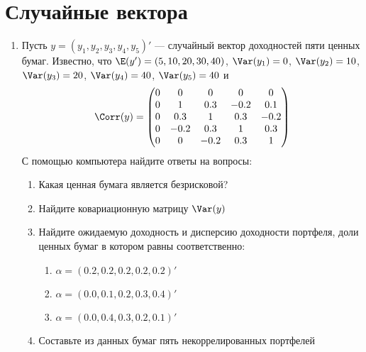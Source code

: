 \section{Случайные вектора}

\begin{enumerate}
\item Пусть $y=(y_1, y_2, y_3, y_4, y_5)'$ --- случайный вектор доходностей пяти ценных бумаг. Известно, что $\E(y')=(5, 10, 20, 30, 40)$, $\Var(y_1)=0$, $\Var(y_2)=10$, $\Var(y_3)=20$, $\Var(y_4)=40$, $\Var(y_5)=40$ и
\[
\Corr(y)=\begin{pmatrix}
0 & 0 & 0 & 0 & 0 \\
0 & 1 & 0.3 & -0.2 & 0.1 \\
0 & 0.3 & 1 & 0.3 & -0.2 \\
0 & -0.2 & 0.3& 1 & 0.3 \\
0 & 0 & -0.2 & 0.3 & 1 
\end{pmatrix}
\]
С помощью компьютера найдите ответы на вопросы:
\begin{enumerate}
\item Какая ценная бумага является безрисковой?
\item Найдите ковариационную матрицу $\Var(y)$
\item Найдите ожидаемую доходность и дисперсию доходности портфеля, доли ценных бумаг в котором равны соответственно:
\begin{enumerate}
\item $\alpha=(0.2, 0.2, 0.2, 0.2, 0.2)'$
\item $\alpha=(0.0, 0.1, 0.2, 0.3, 0.4)'$
\item $\alpha=(0.0, 0.4, 0.3, 0.2, 0.1)'$
\end{enumerate}
\item Составьте из данных бумаг пять некоррелированных портфелей 
\end{enumerate}

\end{enumerate}
